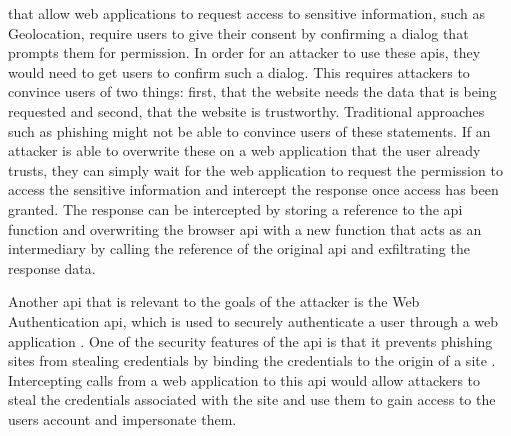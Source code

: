 \BrowserAPIs{} that allow web applications to request access to sensitive information, such as Geolocation, require users to give their consent by confirming a dialog that prompts them for permission. In order for an attacker to use these \acsp{api}, they would need to get users to confirm such a dialog. This requires attackers to convince users of two things: first, that the website needs the data that is being requested and second, that the website is trustworthy. Traditional approaches such as phishing might not be able to convince users of these statements. If an attacker is able to overwrite these \browserAPIs{} on a web application that the user already trusts, they can simply wait for the web application to request the permission to access the sensitive information and intercept the response once access has been granted. The response can be intercepted by storing a reference to the \ac{api} function and overwriting the browser \ac{api} with a new function that acts as an intermediary by calling the reference of the original \ac{api} and exfiltrating the response data.

Another \ac{api} that is relevant to the goals of the attacker is the Web Authentication \ac{api}, which is used to securely authenticate a user through a web application \cite{webauthn}. One of the security features of the \ac{api} is that it prevents phishing sites from stealing credentials by binding the credentials to the origin of a site \cite{webauthn}. Intercepting calls from a web application to this \ac{api} would allow attackers to steal the credentials associated with the site and use them to gain access to the users account and impersonate them.
